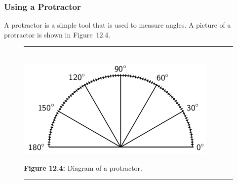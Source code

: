             \subsubsection{ Using a Protractor}
            \nopagebreak
            
          
          \label{m39370*id314383}A protractor is a simple tool that is used to measure angles. A picture of a protractor is shown in Figure~12.4.\par 
          
    \setcounter{subfigure}{0}


	\begin{figure}[H] %
    \begin{center}
    \rule[.1in]{\figurerulewidth}{.005in} \\
        \label{m39370*uid13!!!underscore!!!media}\label{m39370*uid13!!!underscore!!!printimage}\includegraphics{col11306.imgs/m39370_MG10C13_004.png} %
        
      \vspace{2pt}
    \vspace{\rubberspace}\par \begin{cnxcaption}
	  \small \textbf{Figure 12.4: }Diagram of a protractor.
	\end{cnxcaption}
      
    \vspace{.1in}
    \rule[.1in]{\figurerulewidth}{.005in} \\
        
    \end{center}

 \end{figure}   

    \addtocounter{footnote}{-0}
    
